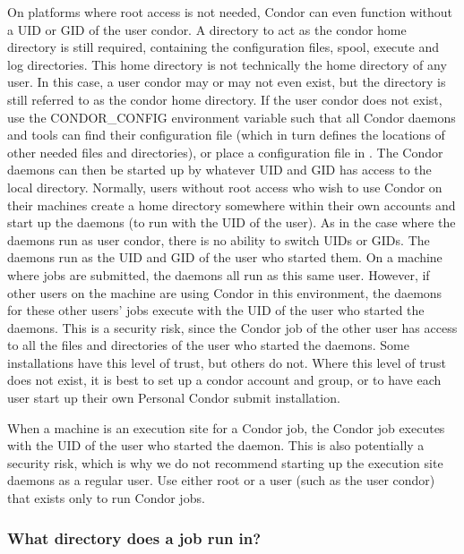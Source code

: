 On platforms where root access is not needed,
Condor can even function without a UID or GID of the user condor.
A directory to act as the condor home directory is still required,
containing the configuration files, spool,
execute and log directories.
This home directory is not technically the
home directory of any user.
In this case, a user condor may or may not even exist,
but the directory is still referred to as the condor home
directory.
If the user condor does not exist,
use the CONDOR\_CONFIG environment variable such
that all Condor daemons and tools
can find their configuration file
(which in turn defines the
locations of other needed files and directories),
or place a configuration file in .
The Condor daemons can then be started up by whatever UID and GID has
access to the local  directory.
Normally, users without root
access who wish to use Condor on their machines create a
 home directory somewhere within their own accounts
and start up the daemons (to run with the UID of the user).
As in the case where the daemons run as user condor,
there is no ability to switch UIDs or GIDs.
The daemons run as the UID and GID of the user who started them.
On a machine where jobs are submitted, the  daemons
all run as this same user.
However, if other users on the machine are using Condor in this
environment, the  daemons for these other users'
jobs execute with the UID of the user who started the daemons.
This is a security risk, since the Condor job of the other user
has access to all the files and directories of the user
who started the daemons.
Some installations have this level of trust,
but others do not.
Where this level of trust does not exist, it is best to set up a
condor account and group, or to have each user start up their own
Personal Condor submit installation.

When a machine is an execution site for a Condor job,
the Condor job executes with the UID of the user who started the
 daemon.
This is also potentially a security risk, which is why we do not
recommend starting up the execution site daemons as a regular user.
Use either root or a user (such as the user condor) that 
exists only to run Condor jobs.

\subsubsection{\label{sec:DirOfJob}What directory does a job run in?}

